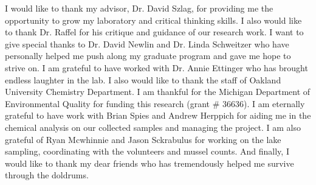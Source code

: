 I would like to thank my advisor, Dr. David Szlag, for providing me the opportunity to grow my laboratory and critical thinking skills. I also would like to thank Dr. Raffel for his critique and guidance of our research work. I want to give special thanks to Dr. David Newlin and Dr. Linda Schweitzer who have personally helped me push along my graduate program and gave me hope to strive on. I am grateful to have worked with Dr. Annie Ettinger who has brought  endless laughter in the lab. I also would like to thank the staff of Oakland University Chemistry Department.   
I am thankful for the Michigan Department of Environmental Quality for funding this research (grant \# 36636). I am eternally grateful to have work with Brian Spies and Andrew Herppich for aiding me in the chemical analysis on our collected samples and managing the project. I am also grateful of Ryan Mcwhinnie and Jason Sckrabulus for working on the lake sampling, coordinating with the volunteers and mussel counts. And finally, I would like to thank my dear friends who has tremendously helped me survive through the doldrums.
